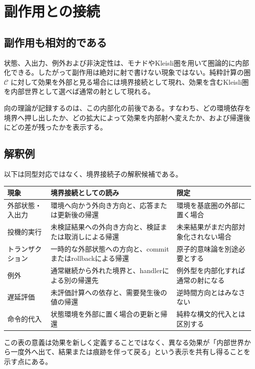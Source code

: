 \documentclass[a4paper,11pt]{ltjsarticle}
\theoremstyle{definition}
\theoremstyle{plain}
\begin{document}
\section{副作用との接続}

\subsection{副作用も相対的である}

状態、入出力、例外および非決定性は、モナドやKleisli圏を用いて圏論的に内部化できる\cite{Moggi1991,PlotkinPower2002}。したがって副作用は絶対に射で書けない現象ではない。純粋計算の圏 $\mathcal C$ に対して効果を外部と見る場合には境界接続として現れ、効果を含むKleisli圏を内部世界として選べば通常の射として現れる。

向の理論が記録するのは、この内部化の前後である。すなわち、どの環境依存を境界へ押し出したか、どの拡大によって効果を内部射へ変えたか、および帰還後にどの差が残ったかを表示する。

\subsection{解釈例}

以下は同型対応ではなく、境界接続子の解釈候補である。
\begin{center}
\begin{tabular}{p{} p{} p{}}
\toprule
現象 & 境界接続としての読み & 限定 \\
\midrule
外部状態・入出力
 & 環境へ向かう外向き方向と、応答または更新後の帰還
 & 環境を基底圏の外部に置く場合 \\
投機的実行
 & 未検証結果への外向き方向と、検証または取消しによる帰還
 & 未来結果がまだ内部対象化されない場合 \\
トランザクション
 & 一時的な外部状態への方向と、commitまたはrollbackによる帰還
 & 原子的意味論を別途必要とする \\
例外
 & 通常継続から外れた境界と、handlerによる別の帰還先
 & 例外型を内部化すれば通常の射になる \\
遅延評価
 & 未評価計算への依存と、需要発生後の値の帰還
 & 逆時間方向とはみなさない \\
命令的代入
 & 状態環境を外部に置く場合の更新と帰還
 & 純粋な構文的代入とは区別する \\
\bottomrule
\end{tabular}
\end{center}

この表の意義は効果を新しく定義することではなく、異なる効果が「内部世界から一度外へ出て、結果または痕跡を伴って戻る」という表示を共有し得ることを示す点にある。
\end{document}
